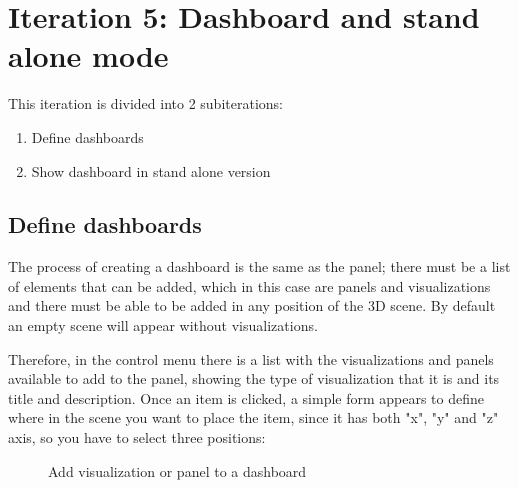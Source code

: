 \documentclass[a4paper, 12pt]{book}
\begin{document}
\section{Iteration 5: Dashboard and stand alone mode}

This iteration is divided into 2 subiterations:

\begin{enumerate}
    \item Define dashboards
    \item Show dashboard in stand alone version
\end{enumerate}

\subsection{Define dashboards}

The process of creating a dashboard is the same as the panel; there must be a list of elements that can be added, which in this case are panels and visualizations and there must be able to be added in any position of the 3D scene. By default an empty scene will appear without visualizations.


Therefore, in the control menu there is a list with the visualizations and panels available to add to the panel, showing the type of visualization that it is and its title and description. Once an item is clicked, a simple form appears to define where in the scene you want to place the item, since it has both "x", "y" and "z" axis, so you have to select three positions:

\begin{figure}[H]
 \centering
 \caption{Add visualization or panel to a dashboard}
 \label{f:threedcexamples}
\end{figure}
\end{document}
